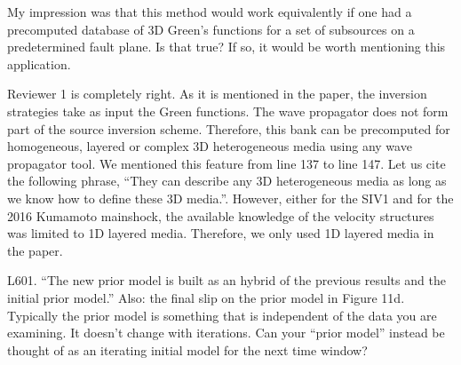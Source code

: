 \documentclass[10pt]{extarticle}
\begin{document}
%
%
\begin{ReviewerComment}{1}
\noindent 
 My impression was that this method would work equivalently if one had a precomputed
 database of 3D Green’s functions for a set of subsources on a predetermined fault plane. Is
 that true? If so, it would be worth mentioning this application.
\end{ReviewerComment}
%
\begin{Answer}
Reviewer 1 is completely right. As it is mentioned in the paper, the inversion strategies 
take as input the Green functions. The wave propagator does not form part of the 
source inversion scheme. Therefore, this bank can be precomputed for homogeneous, layered or 
complex 3D heterogeneous media using any wave propagator tool. We mentioned this feature 
from line 137 to line 147. Let us cite the following phrase, ``They can describe any 3D 
heterogeneous media as long as we know how to define these 3D media.''. However, either for 
the SIV1 and for the 2016 Kumamoto mainshock, the available knowledge of the velocity structures
was limited to 1D layered media. Therefore, we only used 1D layered media in the paper.
 \WorkInProgressRevTask
\end{Answer}
%
%
\begin{ReviewerComment}{1}
\noindent 
 L601. “The new prior model is built as an hybrid of the previous results and the initial
 prior model.” Also: the final slip on the prior model in Figure 11d.
 Typically the prior model is something that is independent of the data you are examining.
 It doesn’t change with iterations. Can your “prior model” instead be thought of as an
 iterating initial model for the next time window?
\end{ReviewerComment}
%
\end{document}
